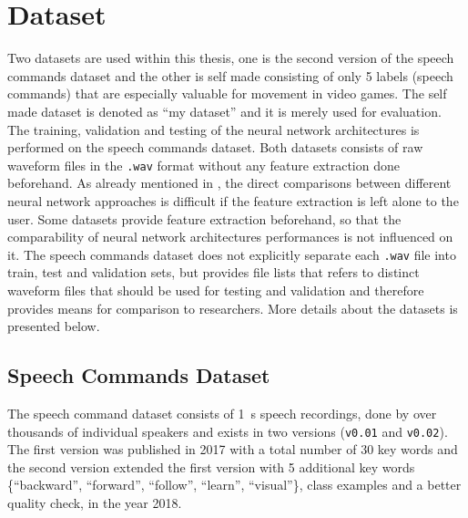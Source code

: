
\section{Dataset}\label{sec:exp_dataset}
\thesisStateRevised
Two datasets are used within this thesis, one is the second version of the speech commands dataset \cite{Warden2018} and the other is self made consisting of only 5 labels (speech commands) that are especially valuable for movement in video games.
The self made dataset is denoted as \enquote{my dataset} and it is merely used for evaluation.
The training, validation and testing of the neural network architectures is performed on the speech commands dataset.
Both datasets consists of raw waveform files in the \texttt{.wav} format without any feature extraction done beforehand.
As already mentioned in , the direct comparisons between different neural network approaches is difficult if the feature extraction is left alone to the user.
Some datasets provide feature extraction beforehand, so that the comparability of neural network architectures performances is not influenced on it.
The speech commands dataset does not explicitly separate each \texttt{.wav} file into train, test and validation sets, but provides file lists that refers to distinct waveform files that should be used for testing and validation and therefore provides means for comparison to researchers.
More details about the datasets is presented below.



\subsection{Speech Commands Dataset}\label{sec:exp_dataset_speech_cmd}
The speech command dataset \cite{Warden2018} consists of \SI{1}{\second} speech recordings, done by over thousands of individual speakers and exists in two versions (\texttt{v0.01} and \texttt{v0.02}).
The first version was published in 2017 with a total number of 30 key words and the second version extended the first version with 5 additional key words \{\enquote{backward}, \enquote{forward}, \enquote{follow}, \enquote{learn}, \enquote{visual}\}, class examples and a better quality check, in the year 2018.

